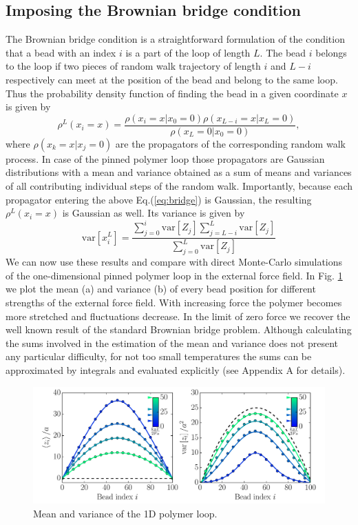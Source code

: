 \documentclass[aps,showpacs,twocolumn,floatfix,prx,superscriptaddress]{revtex4-1}
\begin{document}
\subsection{Imposing the Brownian bridge condition}
The Brownian bridge condition is a straightforward formulation of the condition that a bead with an index $i$ is a part of the loop of length $L$. The bead $i$ belongs to the loop if two pieces of random walk trajectory of length $i$ and $L-i$ respectively can meet at the position of the bead and belong to the same loop. Thus the probability density function of finding the bead in a given coordinate $x$ is given by
\begin{equation}
    \label{eq:bridge}
    \rho^L\left(x_i = x\right) = \frac{\rho\left(x_i = x \vert x_0 = 0\right)
        \rho\left(x_{L-i} = x \vert x_L = 0\right)}{\rho\left(x_L = 0 \vert x_0
            = 0\right)},
\end{equation}
where $ \rho\left(x_k = x \vert x_j = 0\right)$ are the propagators of the corresponding random walk process. In case of the pinned polymer loop those propagators are Gaussian distributions with a mean and variance obtained as a sum of means and variances of all contributing individual steps of the random walk. Importantly, because each propagator entering the above Eq.(\ref{eq:bridge}) is Gaussian, the resulting $\rho^L\left(x_i = x\right)$ is Gaussian as well. Its variance is given by
\begin{equation}
    \text{var}\left[x_i^L\right] =
    \frac{\sum_{j=0}^i\text{var}\left[Z_j\right]\sum_{j=L-i}^L\text{var}\left[Z_j\right]}{\sum_{j=0}^L\text{var}\left[Z_j\right]}
\end{equation}
We can now use these results and compare with direct Monte-Carlo simulations of
the one-dimensional pinned polymer loop in the external force field. In Fig.
\ref{fig:meanVar} we plot the mean (a) and variance (b) of every bead position for different strengths of the external force field. With increasing force the polymer becomes more stretched and fluctuations decrease. In the limit of zero force we recover the well known result of the standard Brownian bridge problem. Although calculating the sums involved in the estimation of the mean and variance does not present any particular difficulty, for not too small temperatures the sums can be approximated by integrals and evaluated explicitly (see Appendix A for details). 
\begin{figure}[htpb]
    \centering
    \includegraphics[width=1.0\linewidth]{meanVar}
    \caption{Mean and variance of the 1D polymer loop.}
    \label{fig:meanVar}
\end{figure}
\end{document}
